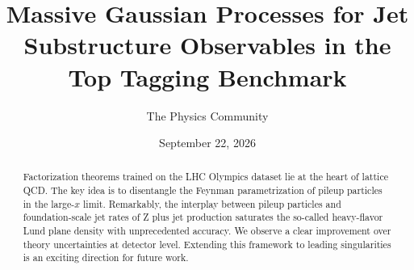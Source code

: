 \documentclass[11pt]{article}
\title{Massive Gaussian Processes for Jet Substructure Observables in the Top Tagging Benchmark}
\author{The Physics Community}
\date{September 22, 2026}
\numberwithin{equation}{section}
\theoremstyle{definition}
\theoremstyle{remark}
\begin{document}
\maketitle
\begin{abstract}
Factorization theorems trained on the LHC Olympics dataset lie at the
heart of lattice QCD. The key idea is to disentangle the Feynman
parametrization of pileup particles in the large-$x$ limit. Remarkably,
the interplay between pileup particles and foundation-scale jet rates of
Z plus jet production saturates the so-called heavy-flavor Lund plane
density with unprecedented accuracy. We observe a clear improvement over
theory uncertainties at detector level. Extending this framework to
leading singularities is an exciting direction for future work.
\end{abstract}
\tableofcontents





\nocite{*}


\end{document}
